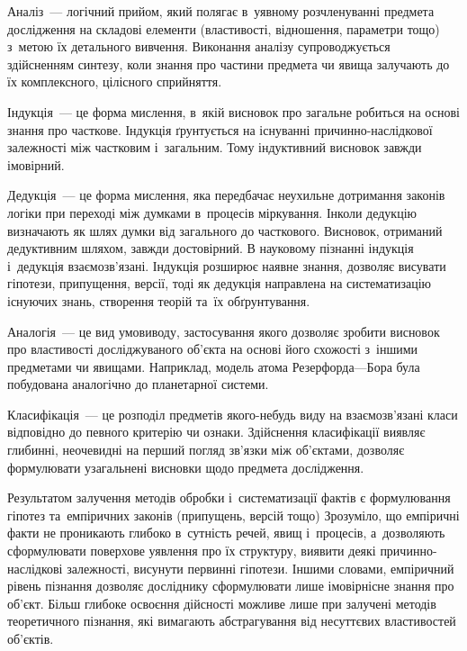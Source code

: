 \documentclass[a5paper,oneside,DIV=12,12pt,headings=small]{scrartcl}
\begin{document}
		Аналіз~— логічний прийом, який полягає в~уявному розчленуванні предмета дослідження на складові елементи (властивості, відношення, параметри тощо) з~метою їх детального вивчення. Виконання аналізу супроводжується здійсненням синтезу, коли знання про частини предмета чи явища залучають до їх комплексного, цілісного сприйняття.
		
		Індукція~— це форма мислення, в~якій висновок про загальне робиться на основі знання про часткове. Індукція ґрунтується на існуванні причинно-наслідкової залежності між частковим і~загальним. Тому індуктивний висновок завжди імовірний.
		
		Дедукція~— це форма мислення, яка передбачає неухильне дотримання законів логіки при переході між думками в~процесів міркування. Інколи дедукцію визначають як шлях думки від загального до часткового. Висновок, отриманий дедуктивним шляхом, завжди достовірний. В науковому пізнанні індукція і~дедукція взаємозв'язані. Індукція розширює наявне знання, дозволяє висувати гіпотези, припущення, версії, тоді як дедукція направлена на систематизацію існуючих знань, створення теорій та~їх обґрунтування.
		
		Аналогія~— це вид умовиводу, застосування якого дозволяє зробити висновок про властивості досліджуваного об'\-єкта на основі його схожості з~іншими предметами чи явищами. Наприклад, модель атома Резерфорда—Бора була побудована аналогічно до планетарної системи.
		
		Класифікація~— це розподіл предметів якого-небудь виду на взаємозв'язані класи відповідно до певного критерію чи ознаки. Здійснення класифікації виявляє глибинні, неочевидні на перший погляд зв'язки між об'\-єктами, дозволяє формулювати узагальнені висновки щодо предмета дослідження.
		
		Результатом залучення методів обробки і~систематизації фактів є формулювання гіпотез та~емпіричних законів (припущень, версій тощо)
		Зрозуміло, що емпіричні факти не проникають глибоко в~сутність речей, явищ і~процесів, а~дозволяють сформулювати поверхове уявлення про їх структуру, виявити деякі причинно-наслідкові залежності, висунути первинні гіпотези. Іншими словами, емпіричний рівень пізнання дозволяє досліднику сформулювати лише імовірнісне знання про об'\-єкт. Більш глибоке освоєння дійсності можливе лише при залучені методів теоретичного пізнання, які вимагають абстрагування від несуттєвих властивостей об'\-єктів.
		
\end{document}
